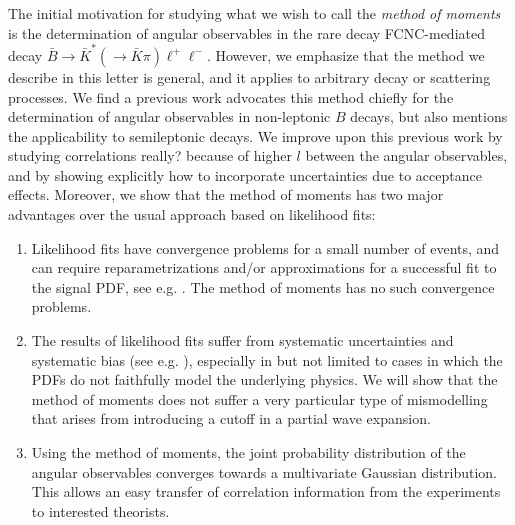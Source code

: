 \documentclass[aps,prd,reprint,nofootinbib,preprintnumbers]{revtex4}
\newcommand{\fred}[1]{{\color{brown!85!black}#1}}
\begin{document}
The initial motivation for studying what we wish to call the
\emph{method of moments} is the determination of angular observables
in the rare decay FCNC-mediated decay $\bar{B}\to \bar{K}^*(\to
\bar{K}\pi)\ell^+\ell^-$. However, we emphasize that the method we
describe in this letter is general, and it applies to arbitrary decay
or scattering processes. We find a previous work \cite{Dighe:1998vk}
advocates this method chiefly for the determination of angular
observables in non-leptonic $B$ decays, but also mentions the
applicability to semileptonic decays. We improve upon this previous
work by studying correlations \fred{really? because of higher $l$}
between the angular observables, and by showing explicitly how to
incorporate uncertainties due to acceptance effects. Moreover, we show
that the method of moments has two major advantages over the usual
approach based on likelihood fits:
\begin{enumerate}
    \item Likelihood fits have convergence problems for a small number of
        events, and can require reparametrizations and/or approximations
        for a successful fit to the signal PDF, see e.g. \cite{Egede:2008uy}.
        The method of moments has no such convergence problems.
    \item The results of likelihood fits suffer from systematic uncertainties
        and systematic bias (see e.g. \cite{Egede:2008uy}), especially in but not limited
        to cases in which the PDFs do not faithfully model the underlying physics. We will
        show that the method of moments does not suffer a very particular type of
        mismodelling that arises from introducing a cutoff in a partial wave expansion.
    \item Using the method of moments, the joint probability distribution of the
        angular observables converges towards a multivariate Gaussian distribution.
        This allows an easy transfer of correlation information from the experiments to
        interested theorists.
\end{enumerate}
\end{document}
